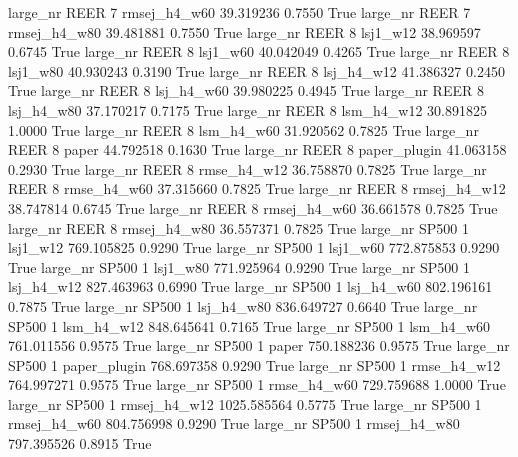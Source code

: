   large_nr     REER                 7 rmsej_h4_w60   39.319236      0.7550    True
  large_nr     REER                 7 rmsej_h4_w80   39.481881      0.7550    True
  large_nr     REER                 8     lsj1_w12   38.969597      0.6745    True
  large_nr     REER                 8     lsj1_w60   40.042049      0.4265    True
  large_nr     REER                 8     lsj1_w80   40.930243      0.3190    True
  large_nr     REER                 8   lsj_h4_w12   41.386327      0.2450    True
  large_nr     REER                 8   lsj_h4_w60   39.980225      0.4945    True
  large_nr     REER                 8   lsj_h4_w80   37.170217      0.7175    True
  large_nr     REER                 8   lsm_h4_w12   30.891825      1.0000    True
  large_nr     REER                 8   lsm_h4_w60   31.920562      0.7825    True
  large_nr     REER                 8        paper   44.792518      0.1630    True
  large_nr     REER                 8 paper_plugin   41.063158      0.2930    True
  large_nr     REER                 8  rmse_h4_w12   36.758870      0.7825    True
  large_nr     REER                 8  rmse_h4_w60   37.315660      0.7825    True
  large_nr     REER                 8 rmsej_h4_w12   38.747814      0.6745    True
  large_nr     REER                 8 rmsej_h4_w60   36.661578      0.7825    True
  large_nr     REER                 8 rmsej_h4_w80   36.557371      0.7825    True
  large_nr    SP500                 1     lsj1_w12  769.105825      0.9290    True
  large_nr    SP500                 1     lsj1_w60  772.875853      0.9290    True
  large_nr    SP500                 1     lsj1_w80  771.925964      0.9290    True
  large_nr    SP500                 1   lsj_h4_w12  827.463963      0.6990    True
  large_nr    SP500                 1   lsj_h4_w60  802.196161      0.7875    True
  large_nr    SP500                 1   lsj_h4_w80  836.649727      0.6640    True
  large_nr    SP500                 1   lsm_h4_w12  848.645641      0.7165    True
  large_nr    SP500                 1   lsm_h4_w60  761.011556      0.9575    True
  large_nr    SP500                 1        paper  750.188236      0.9575    True
  large_nr    SP500                 1 paper_plugin  768.697358      0.9290    True
  large_nr    SP500                 1  rmse_h4_w12  764.997271      0.9575    True
  large_nr    SP500                 1  rmse_h4_w60  729.759688      1.0000    True
  large_nr    SP500                 1 rmsej_h4_w12 1025.585564      0.5775    True
  large_nr    SP500                 1 rmsej_h4_w60  804.756998      0.9290    True
  large_nr    SP500                 1 rmsej_h4_w80  797.395526      0.8915    True
